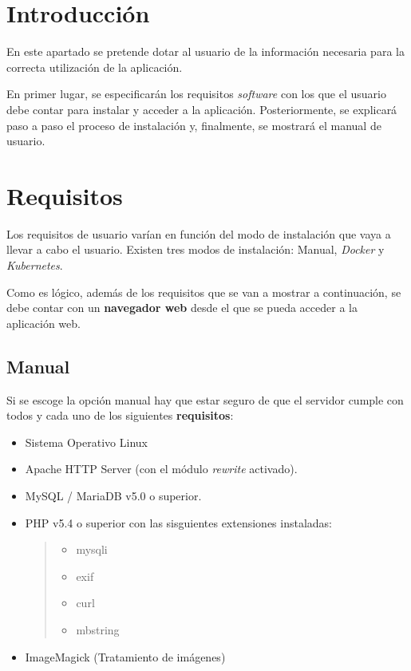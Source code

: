 
\section{Introducción}

En este apartado se pretende dotar al usuario de la información
necesaria para la correcta utilización de la aplicación. 

En primer lugar, se especificarán los requisitos \emph{software} con los que el
usuario debe contar para instalar y acceder a la aplicación. Posteriormente, se
explicará paso a paso el proceso de instalación y, finalmente, se
mostrará el manual de usuario.


\section{Requisitos}
Los requisitos de usuario varían en función del modo de instalación que
vaya a llevar a cabo el usuario. Existen tres modos de instalación:
Manual, \emph{Docker} y \emph{Kubernetes}.

Como es lógico, además de los requisitos que se van a mostrar a
continuación, se debe contar con un \textbf{navegador web} desde el que
se pueda acceder a la aplicación web.


\subsection{Manual}

Si se escoge la opción manual hay que estar seguro de que el servidor
cumple con todos y cada uno de los siguientes \textbf{requisitos}:

\begin{itemize}
\tightlist
\item
  Sistema Operativo Linux \cite{linux:web}
\item
  Apache HTTP Server \cite{apache:install} (con el módulo \emph{rewrite} activado).
\item
  MySQL / MariaDB v5.0 \cite{mysql:install} o superior.
\item
  PHP v5.4 \cite{php:install} o superior con las sisguientes extensiones instaladas:
  \begin{quote}
  \begin{itemize}
  \tightlist
  \item
    mysqli
  \item
    exif
  \item
    curl
  \item
    mbstring
  \end{itemize}
  \end{quote}
\item
  ImageMagick \cite{imagemagick:install} (Tratamiento de imágenes)
\end{itemize}

